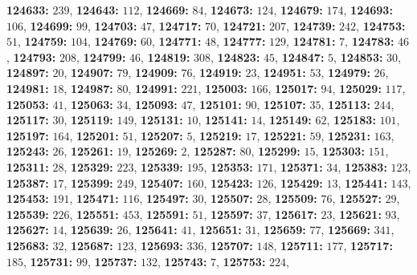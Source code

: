 \textsf{\bfseries 124633:} $239$, \textsf{\bfseries 124643:} $112$, \textsf{\bfseries 124669:} $84$, \textsf{\bfseries 124673:} $124$, \textsf{\bfseries 124679:} $174$, \textsf{\bfseries 124693:} $106$, \textsf{\bfseries 124699:} $99$, \textsf{\bfseries 124703:} $47$, \textsf{\bfseries 124717:} $70$, \textsf{\bfseries 124721:} $207$, \textsf{\bfseries 124739:} $242$, \textsf{\bfseries 124753:} $51$, \textsf{\bfseries 124759:} $104$, \textsf{\bfseries 124769:} $60$, \textsf{\bfseries 124771:} $48$, \textsf{\bfseries 124777:} $129$, \textsf{\bfseries 124781:} $7$, \textsf{\bfseries 124783:} $46$, \textsf{\bfseries 124793:} $208$, \textsf{\bfseries 124799:} $46$, \textsf{\bfseries 124819:} $308$, \textsf{\bfseries 124823:} $45$, \textsf{\bfseries 124847:} $5$, \textsf{\bfseries 124853:} $30$, \textsf{\bfseries 124897:} $20$, \textsf{\bfseries 124907:} $79$, \textsf{\bfseries 124909:} $76$, \textsf{\bfseries 124919:} $23$, \textsf{\bfseries 124951:} $53$, \textsf{\bfseries 124979:} $26$, \textsf{\bfseries 124981:} $18$, \textsf{\bfseries 124987:} $80$, \textsf{\bfseries 124991:} $221$, \textsf{\bfseries 125003:} $166$, \textsf{\bfseries 125017:} $94$, \textsf{\bfseries 125029:} $117$, \textsf{\bfseries 125053:} $41$, \textsf{\bfseries 125063:} $34$, \textsf{\bfseries 125093:} $47$, \textsf{\bfseries 125101:} $90$, \textsf{\bfseries 125107:} $35$, \textsf{\bfseries 125113:} $244$, \textsf{\bfseries 125117:} $30$, \textsf{\bfseries 125119:} $149$, \textsf{\bfseries 125131:} $10$, \textsf{\bfseries 125141:} $14$, \textsf{\bfseries 125149:} $62$, \textsf{\bfseries 125183:} $101$, \textsf{\bfseries 125197:} $164$, \textsf{\bfseries 125201:} $51$, \textsf{\bfseries 125207:} $5$, \textsf{\bfseries 125219:} $17$, \textsf{\bfseries 125221:} $59$, \textsf{\bfseries 125231:} $163$, \textsf{\bfseries 125243:} $26$, \textsf{\bfseries 125261:} $19$, \textsf{\bfseries 125269:} $2$, \textsf{\bfseries 125287:} $80$, \textsf{\bfseries 125299:} $15$, \textsf{\bfseries 125303:} $151$, \textsf{\bfseries 125311:} $28$, \textsf{\bfseries 125329:} $223$, \textsf{\bfseries 125339:} $195$, \textsf{\bfseries 125353:} $171$, \textsf{\bfseries 125371:} $34$, \textsf{\bfseries 125383:} $123$, \textsf{\bfseries 125387:} $17$, \textsf{\bfseries 125399:} $249$, \textsf{\bfseries 125407:} $160$, \textsf{\bfseries 125423:} $126$, \textsf{\bfseries 125429:} $13$, \textsf{\bfseries 125441:} $143$, \textsf{\bfseries 125453:} $191$, \textsf{\bfseries 125471:} $116$, \textsf{\bfseries 125497:} $30$, \textsf{\bfseries 125507:} $28$, \textsf{\bfseries 125509:} $76$, \textsf{\bfseries 125527:} $29$, \textsf{\bfseries 125539:} $226$, \textsf{\bfseries 125551:} $453$, \textsf{\bfseries 125591:} $51$, \textsf{\bfseries 125597:} $37$, \textsf{\bfseries 125617:} $23$, \textsf{\bfseries 125621:} $93$, \textsf{\bfseries 125627:} $14$, \textsf{\bfseries 125639:} $26$, \textsf{\bfseries 125641:} $41$, \textsf{\bfseries 125651:} $31$, \textsf{\bfseries 125659:} $77$, \textsf{\bfseries 125669:} $341$, \textsf{\bfseries 125683:} $32$, \textsf{\bfseries 125687:} $123$, \textsf{\bfseries 125693:} $336$, \textsf{\bfseries 125707:} $148$, \textsf{\bfseries 125711:} $177$, \textsf{\bfseries 125717:} $185$, \textsf{\bfseries 125731:} $99$, \textsf{\bfseries 125737:} $132$, \textsf{\bfseries 125743:} $7$, \textsf{\bfseries 125753:} $224$, 

